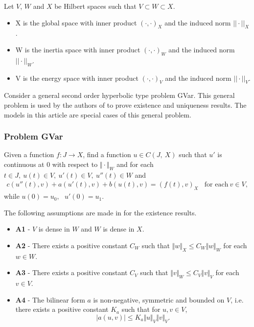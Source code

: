 		Let $V$, $W$ and $X$ be Hilbert spaces such that $V \subset W \subset X$.
		\begin{itemize}
			\item[] X is the global space with inner product $(\cdot,\cdot)_X$ and the induced norm $||\cdot||_X$.
			\item[] W is the inertia space with inner product $(\cdot,\cdot)_W$ and the induced norm $||\cdot||_W$.
			\item[] V is the energy space with inner product $(\cdot,\cdot)_V$ and the induced norm $||\cdot||_V$.
		\end{itemize}

		Consider a general second order hyperbolic type problem GVar. This general problem is used by the 
		authors of \cite{VV02} to prove existence and uniqueness results. The models in this article are 
		special cases of this general problem.

		\subsubsection*{Problem GVar}\label{sssec:existence:ProblemGVar}
		Given a function $f:J\rightarrow X$, find a function $u\in C(J,\ X)$ such that $u'$ is continuous at $0$ with respect to $\Vert \cdot \Vert_{W}$ and for each $t\in J,\ u(t)\in V,\ u'(t) \in V,\ u''(t)\in W$ and
		\begin{eqnarray}
			c(u''(t),v)+a(u'(t),v)+b(u(t),v)= (f(t),v)_{X} \ \ \ \ \textrm{for each} \ v \in V, \label{eq:existence:ProblemGVar}
		\end{eqnarray}
		while $u(0)=u_{0},\ \ \ u'(0)=u_{1}$.


		The following assumptions are made in \cite{VV02} for the existence results.
		\begin{itemize}
			\item[] \textbf{A1} - $V$ is dense in $W$ and $W$ is dense in $X$.

			\item[] \textbf{A2} - There exists a positive constant $C_{W}$ such that $\Vert w\Vert_{X} \leq C_{W}\Vert w\Vert_{W}$ for each $ w\in W$.

			\item[] \textbf{A3} - There exists a positive constant $C_{V}$ such that $\Vert v\Vert_{W} \leq C_{V}\Vert v\Vert_{V}$ for each $v \in V$.

			\item[] \textbf{A4} - The bilinear form $a$ is non-negative, symmetric and bounded on $V$, i.e. there exists a positive constant $K_a$ such that for $\displaystyle u,v \in V$, \[|a(u,v)| \leq K_a\Vert u \Vert_V \Vert v \Vert_V.\]
		\end{itemize}

